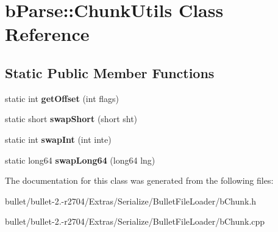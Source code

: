 \hypertarget{classb_parse_1_1_chunk_utils}{\section{b\+Parse\+:\+:Chunk\+Utils Class Reference}
\label{classb_parse_1_1_chunk_utils}
}
\subsection*{Static Public Member Functions}
\begin{DoxyCompactItemize}
\item 
\hypertarget{classb_parse_1_1_chunk_utils_a48fd26ae65bdff178dc00b8b3ae87ce0}{static int {\bfseries get\+Offset} (int flags)}\label{classb_parse_1_1_chunk_utils_a48fd26ae65bdff178dc00b8b3ae87ce0}

\item 
\hypertarget{classb_parse_1_1_chunk_utils_a5f7b8bdd1683568c354038bdac3f3faf}{static short {\bfseries swap\+Short} (short sht)}\label{classb_parse_1_1_chunk_utils_a5f7b8bdd1683568c354038bdac3f3faf}

\item 
\hypertarget{classb_parse_1_1_chunk_utils_ace97ec927d078faabc6b33ac62e4ad79}{static int {\bfseries swap\+Int} (int inte)}\label{classb_parse_1_1_chunk_utils_ace97ec927d078faabc6b33ac62e4ad79}

\item 
\hypertarget{classb_parse_1_1_chunk_utils_affcb49ace1a7e0947531fcaa6797e233}{static long64 {\bfseries swap\+Long64} (long64 lng)}\label{classb_parse_1_1_chunk_utils_affcb49ace1a7e0947531fcaa6797e233}

\end{DoxyCompactItemize}


The documentation for this class was generated from the following files\+:\begin{DoxyCompactItemize}
\item 
bullet/bullet-\/2.-\/r2704/\+Extras/\+Serialize/\+Bullet\+File\+Loader/b\+Chunk.\+h\item 
bullet/bullet-\/2.-\/r2704/\+Extras/\+Serialize/\+Bullet\+File\+Loader/b\+Chunk.\+cpp\end{DoxyCompactItemize}
